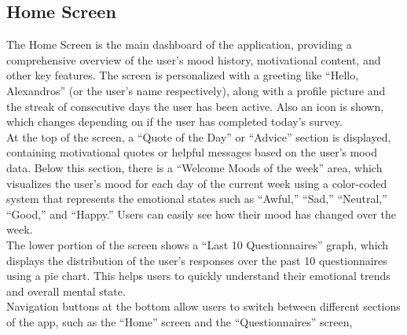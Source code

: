 \vspace{5mm}

\subsection{Home Screen}

The Home Screen is the main dashboard of the application, providing a comprehensive overview of the user's mood history, motivational content, and other key features. The screen is personalized with a greeting like ``Hello, Alexandros'' (or the user's name respectively), along with a profile picture and the streak of consecutive days the user has been active. Also an icon is shown, which changes depending on if the user has completed today's survey.\vspace{5mm} \\
At the top of the screen, a ``Quote of the Day'' or ``Advice'' section is displayed, containing motivational quotes or helpful messages based on the user’s mood data. Below this section, there is a ``Welcome Moods of the week'' area, which visualizes the user’s mood for each day of the current week using a color-coded system that represents the emotional states such as ``Awful,'' ``Sad,'' ``Neutral,'' ``Good,'' and ``Happy.'' Users can easily see how their mood has changed over the week.\vspace{5mm} \\
The lower portion of the screen shows a ``Last 10 Questionnaires'' graph, which displays the distribution of the user’s responses over the past 10 questionnaires using a pie chart. This helps users to quickly understand their emotional trends and overall mental state.\vspace{5mm} \\
Navigation buttons at the bottom allow users to switch between different sections of the app, such as the ``Home'' screen and the ``Questionnaires'' screen,

\vspace{5mm}

